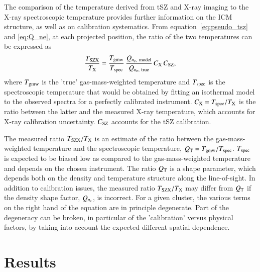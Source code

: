 \documentclass[twocolumn,traditabstract]{aa}
\newcommand{\ccor}[1]{\textcolor{Mypink}{#1}}
\def\TSZ {T_{\rm SZX}}
\def\TMW {T_{\rm gmw}}
\def \TX {T_{\rm X}}
\begin{document}
\ccor{The comparison of the temperature derived from tSZ and X-ray imaging to the X-ray spectroscopic temperature provides further information on the ICM structure, as well as on calibration systematics. From equation~\ref{eq:pseudo_tsz} and \ref{eq:Q_ne}, at each projected position, the ratio of the two temperatures can be expressed as
\begin{equation}
	\frac{\TSZ }{\TX} = \frac{\TMW}{T_{\rm spec}}\,\frac{Q_{n_{\rm e}, \ {\rm model}}} {Q_{n_{\rm e}, \ {\rm true}}} \, C_{\rm X}\,C_{\rm SZ},
\label{eq:T_ratio}
\end{equation}
where $\TMW$ is the 'true' gas-mass-weighted temperature and $T_{\rm spec}$ is the spectroscopic temperature that would be obtained by fitting an isothermal model to the observed spectra for a perfectly calibrated instrument. $C_{\rm X} = T_{\rm spec}/\TX$ is the ratio between the latter and the measured X-ray temperature, which accounts for X-ray calibration uncertainty. $C_{\rm SZ}$ accounts for the tSZ calibration.}

\ccor{The measured ratio $\TSZ/\TX$ is an estimate of the ratio between the gas-mass-weighted temperature and the spectroscopic temperature, $Q{_{\rm T}}= \TMW/T_{\rm spec}$. $T_{\rm spec}$ is expected to be biased low as compared to the gas-mass-weighted temperature and depends on the chosen instrument. The ratio $Q_{\rm T}$ is a shape parameter, which depends both on the density and temperature structure along the line-of-sight. In addition to calibration issues, the measured ratio $\TSZ/\TX$ may differ from $Q{_{\rm T}}$ if the density shape factor, $Q_{n_{\rm e}}$, is incorrect. For a given cluster, the various terms on the right hand of the equation are in principle degenerate. Part of the degeneracy can be broken, in particular of the 'calibration' versus physical factors, by taking into account the expected different spatial dependence.}

\section{Results}\label{sec:results}
\end{document}
